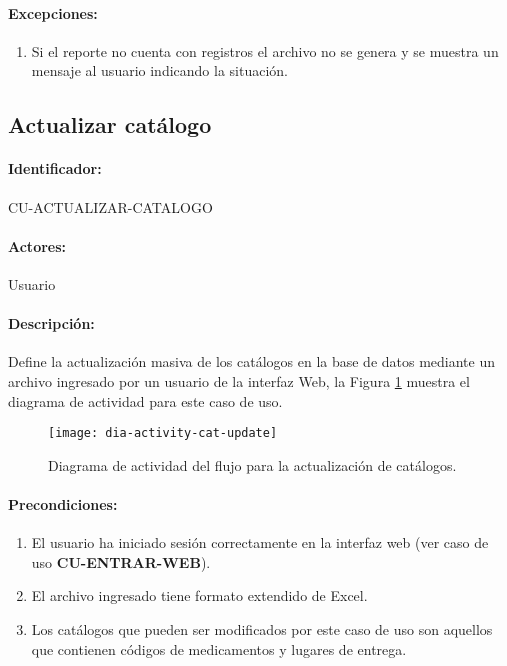 \paragraph{Excepciones:}
\begin{enumerate}
  \item Si el reporte no cuenta con registros el archivo no se genera y se muestra un mensaje al usuario indicando la situación.
\end{enumerate}


\subsection{Actualizar catálogo}\label{cu-actualizar-catalogo}
\paragraph{Identificador:}
CU-ACTUALIZAR-CATALOGO
\paragraph{Actores:}
Usuario
\paragraph{Descripción:}
Define la actualización masiva de los catálogos en la base de datos mediante un archivo ingresado por un usuario de la interfaz Web, la Figura \ref{fig:dia-activity-cat-update} muestra el diagrama de actividad para este caso de uso.
\begin{figure}[h]
  \centering
  \texttt{[image: dia-activity-cat-update]}
  \caption{Diagrama de actividad del flujo para la actualización de catálogos.}
  \label{fig:dia-activity-cat-update}
\end{figure}
\paragraph{Precondiciones:}
\begin{enumerate}
  \item El usuario ha iniciado sesión correctamente en la interfaz web (ver caso de uso \textbf{CU-ENTRAR-WEB}).
  \item El archivo ingresado tiene formato extendido de Excel\textsuperscript{\textcopyright}.
  \item Los catálogos que pueden ser modificados por este caso de uso son aquellos que contienen códigos de medicamentos y lugares de entrega.
\end{enumerate}

